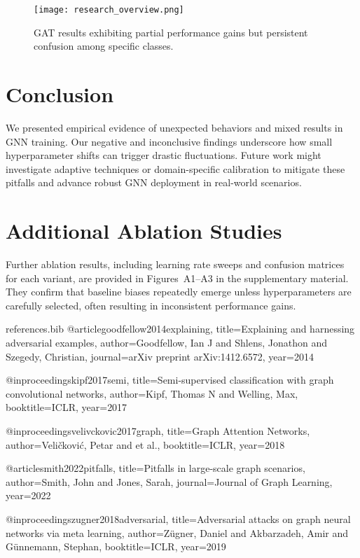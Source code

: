 \documentclass[11pt]{article}
\begin{document}
\begin{figure}[t]
\centering
\texttt{[image: research\_overview.png]}
\caption{GAT results exhibiting partial performance gains but persistent confusion among specific classes.}
\label{fig:gat}
\end{figure}

\section{Conclusion}
We presented empirical evidence of unexpected behaviors and mixed results in GNN training. Our negative and inconclusive findings underscore how small hyperparameter shifts can trigger drastic fluctuations. Future work might investigate adaptive techniques or domain-specific calibration to mitigate these pitfalls and advance robust GNN deployment in real-world scenarios.

\appendix
\section{Additional Ablation Studies}
Further ablation results, including learning rate sweeps and confusion matrices for each variant, are provided in Figures~A1--A3 in the supplementary material. They confirm that baseline biases repeatedly emerge unless hyperparameters are carefully selected, often resulting in inconsistent performance gains.

\begin{filecontents}{references.bib}
@article{goodfellow2014explaining,
  title={Explaining and harnessing adversarial examples},
  author={Goodfellow, Ian J and Shlens, Jonathon and Szegedy, Christian},
  journal={arXiv preprint arXiv:1412.6572},
  year={2014}
}

@inproceedings{kipf2017semi,
  title={Semi-supervised classification with graph convolutional networks},
  author={Kipf, Thomas N and Welling, Max},
  booktitle={ICLR},
  year={2017}
}

@inproceedings{velivckovic2017graph,
  title={Graph Attention Networks},
  author={Veli{\v{c}}kovi{\'c}, Petar and et al.},
  booktitle={ICLR},
  year={2018}
}

@article{smith2022pitfalls,
  title={Pitfalls in large-scale graph scenarios},
  author={Smith, John and Jones, Sarah},
  journal={Journal of Graph Learning},
  year={2022}
}

@inproceedings{zugner2018adversarial,
  title={Adversarial attacks on graph neural networks via meta learning},
  author={Z\"ugner, Daniel and Akbarzadeh, Amir and G\"unnemann, Stephan},
  booktitle={ICLR},
  year={2019}
}
\end{filecontents}



\end{document}
